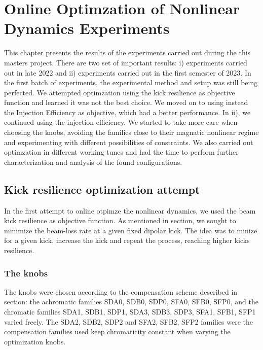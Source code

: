 \chapter{Online Optimzation of Nonlinear Dynamics Experiments}
This chapter presents the results of the experiments carried out during the this masters project. There are two set of important results: i) experiments carried out in late 2022 and ii) experiments carried out in the first semester of 2023. In the first batch of experiments, the experimental method and setup was still being perfected. We attempted optimzation using the kick resilience as objective function and learned it was not the best choice. We moved on to using instead the Injection Efficiency as objective, which had a better performance.  In ii), we continued using the injection efficiency. We started to take more care when choosing the knobs, avoiding the families close to their magnatic nonlinear regime and experimenting with different possibilities of constraints. We also carried out optimzation in different working tunes and had the time to perform further characterization and analysis of the found configurations.
\section{Kick resilience optimization attempt}
\label{experiments22}
In the first attempt to online otpimze the nonlinear dynamics, we used the beam kick resilience as objective function. As mentioned in section, we sought to minimize the beam-loss rate at a given fixed dipolar kick. The idea was to minize for a given kick, increase the kick and repeat the process, reaching higher kicks resilience.
\subsection{The knobs}
The knobs were chosen according to the compensation scheme described in section: the achromatic families SDA0, SDB0, SDP0, SFA0, SFB0, SFP0, and the chromatic families SDA1, SDB1, SDP1, SDA3, SDB3, SDP3, SFA1, SFB1, SFP1 varied freely. The SDA2, SDB2, SDP2 and SFA2, SFB2, SFP2 families were the compensation families used keep chromaticity constant when varying the optimization knobs.
